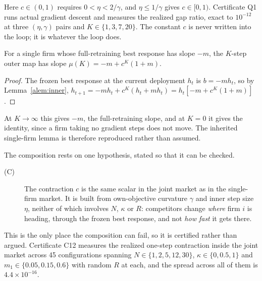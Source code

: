 Here $c \in (0,1)$ requires $0 < \eta < 2/\gamma$, and $\eta \leq 1/\gamma$ gives $c \in [0,1)$. Certificate Q1 runs actual gradient descent and measures the realized gap ratio, exact to $10^{-12}$ at three $(\eta,\gamma)$ pairs and $K \in \{1,3,7,20\}$. The constant $c$ is never written into the loop; it is whatever the loop does.

\begin{alemma}
\label{alem:lazy}
For a single firm whose full-retraining best response has slope $-m$, the $K$-step outer map has slope $\mu(K) = -m + c^K(1+m)$.
\end{alemma}

\begin{proof}
The frozen best response at the current deployment $h_t$ is $b = -mh_t$, so by Lemma~\ref{alem:inner}, $h_{t+1} = -mh_t + c^K(h_t + mh_t) = h_t[-m + c^K(1+m)]$.
\end{proof}

At $K \to \infty$ this gives $-m$, the full-retraining slope, and at $K=0$ it gives the identity, since a firm taking no gradient steps does not move. The inherited single-firm lemma is therefore reproduced rather than assumed.

The composition rests on one hypothesis, stated so that it can be checked.

\begin{description}
\item[(C)] The contraction $c$ is the same scalar in the joint market as in the single-firm market. It is built from own-objective curvature $\gamma$ and inner step size $\eta$, neither of which involves $N$, $\kappa$ or $R$: competitors change \emph{where} firm $i$ is heading, through the frozen best response, and not \emph{how fast} it gets there.
\end{description}

This is the only place the composition can fail, so it is certified rather than argued. Certificate C12 measures the realized one-step contraction inside the joint market across 45 configurations spanning $N \in \{1,2,5,12,30\}$, $\kappa \in \{0,0.5,1\}$ and $m_1 \in \{0.05,0.15,0.6\}$ with random $R$ at each, and the spread across all of them is $4.4\times 10^{-16}$.

